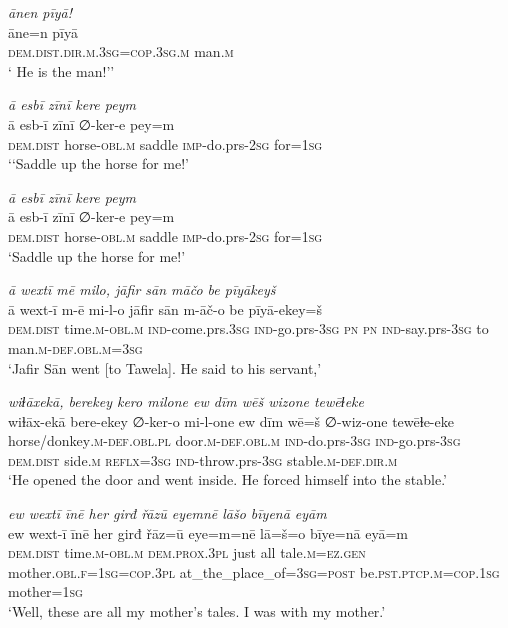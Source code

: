 \ea \label{ŠJ.19}
\textit{ānen pīyā!} \\ 
\gll āne=n pīyā \\ 
 \textsc{dem.dist}\textsc{.dir}\textsc{.m}\textsc{.3sg}\textsc{=cop}\textsc{.3sg}\textsc{.m} man\textsc{.m} \\ 
\glt ` He is the man!’'
\z 
 
\ea \label{ŠJ.52}
\textit{ā esbī zīnī kere peym} \\ 
\gll ā esb-ī zīnī ∅-ker-e pey=m \\ 
 \textsc{dem.dist} horse\textsc{-obl}\textsc{.m} saddle \textsc{imp-}do.prs-\textsc{2sg} for\textsc{=\textsc{1sg}} \\ 
\glt `‘Saddle up the horse for me!'
\z 
 
\ea \label{ŠJ.53}
\textit{ā esbī zīnī kere peym} \\ 
\gll ā esb-ī zīnī ∅-ker-e pey=m \\ 
 \textsc{dem.dist} horse\textsc{-obl}\textsc{.m} saddle \textsc{imp-}do.prs-\textsc{2sg} for\textsc{=\textsc{1sg}} \\ 
\glt `Saddle up the horse for me!'
\z 
 
\ea \label{ŠJ.59}
\textit{ā wextī mē milo, jāfir sān māčo be pīyākeyš} \\ 
\gll ā wext-ī m-ē mi-l-o jāfir sān m-āč-o be pīyā-ekey=š \\ 
 \textsc{dem.dist} time\textsc{.m}\textsc{-obl}\textsc{.m} \textsc{ind-}come.prs\textsc{.3sg} \textsc{ind-}go.prs\textsc{-3sg} \textsc{pn} \textsc{pn} \textsc{ind-}say.prs\textsc{-3sg} to man\textsc{.m}\textsc{-def}\textsc{.obl}\textsc{.m}\textsc{=3sg} \\ 
\glt `Jafir Sān went [to Tawela]. He said to his servant,'
\z 
 
\ea \label{ŠJ.64}
\textit{wiɫāxekā, berekey kero milone ew dīm wēš wizone tewēɫeke} \\ 
\gll wiɫāx-ekā bere-ekey ∅-ker-o mi-l-one ew dīm wē=š ∅-wiz-one tewēɫe-eke \\ 
 horse/donkey\textsc{.m}\textsc{-def}\textsc{.obl}\textsc{.pl} door\textsc{.m}\textsc{-def}\textsc{.obl}\textsc{.m} \textsc{ind-}do.prs\textsc{-3sg} \textsc{ind-}go.prs\textsc{-3sg} \textsc{dem.dist} side\textsc{.m} \textsc{reflx}\textsc{=3sg} \textsc{ind-}throw.prs\textsc{-3sg} stable\textsc{.m}\textsc{-def}\textsc{.dir}\textsc{.m} \\ 
\glt `He opened the door and went inside. He forced himself into the stable.'
\z 
 
\ea \label{KŠ.1}
\textit{ew wextī īnē her girđ řāzū eyemnē lāšo bīyenā eyām} \\ 
\gll ew wext-ī īnē her girđ řāz=ū eye=m=nē lā=š=o bīye=nā eyā=m \\ 
 \textsc{dem.dist} time\textsc{.m}\textsc{-obl}\textsc{.m} \textsc{dem.prox}\textsc{.3pl} just all tale\textsc{.m}\textsc{=ez.gen} mother\textsc{.obl}\textsc{.f}\textsc{=\textsc{1sg}}\textsc{=cop}\textsc{.3pl} at\_the\_place\_of\textsc{=3sg}\textsc{=\textsc{post}} be\textsc{.pst}\textsc{.ptcp}\textsc{.m}\textsc{=cop}\textsc{.\textsc{1sg}} mother\textsc{=\textsc{1sg}} \\ 
\glt `Well, these are all my mother’s tales. I was with my mother.'
\z 
 
